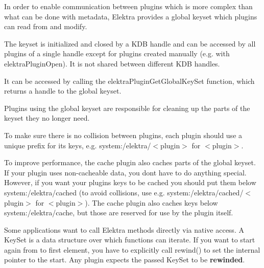 In order to enable communication between plugins which is more complex than what can be done with metadata, Elektra provides a global keyset which plugins can read from and modify.

The keyset is initialized and closed by a K\+DB handle and can be accessed by all plugins of a single handle except for plugins created manually (e.\+g. with {\ttfamily elektra\+Plugin\+Open}). It is not shared between different K\+DB handles.

It can be accessed by calling the {\ttfamily elektra\+Plugin\+Get\+Global\+Key\+Set} function, which returns a handle to the global keyset.

Plugins using the global keyset are responsible for cleaning up the parts of the keyset they no longer need.

To make sure there is no collision between plugins, each plugin should use a unique prefix for its keys, e.\+g. {\ttfamily system\+:/elektra/$<$plugin$>$} for {\ttfamily $<$plugin$>$}.

To improve performance, the {\ttfamily cache} plugin also caches parts of the global keyset. If your plugin uses non-\/cacheable data, you don\textquotesingle{}t have to do anything special. However, if you want your plugin\textquotesingle{}s keys to be cached you should put them below {\ttfamily system\+:/elektra/cached} (to avoid collisions, use e.\+g. {\ttfamily system\+:/elektra/cached/$<$plugin$>$} for {\ttfamily $<$plugin$>$}). The {\ttfamily cache} plugin also caches keys below {\ttfamily system\+:/elektra/cache}, but those are reserved for use by the plugin itself.

Some applications want to call Elektra methods directly via native access. A {\ttfamily Key\+Set} is a data structure over which functions can iterate. If you want to start again from to first element, you have to explicitly call {\ttfamily rewind()} to set the internal pointer to the start. Any plugin expects the passed {\ttfamily Key\+Set} to be {\bfseries rewinded}. 